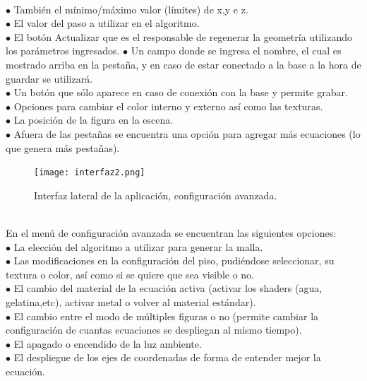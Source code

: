 \documentclass[12pt]{article}
\begin{document}
\\$\bullet$ También el mínimo/máximo valor (límites) de x,y e z.
\\$\bullet$ El valor del paso a utilizar en el algoritmo.
\\$\bullet$ El botón Actualizar que es el responsable de regenerar la geometría utilizando los parámetros ingresados.
\clearpage
$\bullet$ Un campo donde se ingresa el nombre, el cual es mostrado arriba en la pestaña, y en caso de estar conectado a la base a la hora de guardar se utilizará.
\\$\bullet$ Un botón que sólo aparece en caso de conexión con la base y permite grabar.
\\$\bullet$ Opciones para cambiar el color interno y externo así como las texturas.
\\$\bullet$ La posición de la figura en la escena.
\\$\bullet$ Afuera de las pestañas se encuentra una opción para agregar más ecuaciones (lo que genera más pestañas). \\
\begin{figure}
\texttt{[image: interfaz2.png]} 
\caption{Interfaz lateral de la aplicación, configuración avanzada.}
\label{fig:subim1}
\end{figure}
\\En el menú de configuración avanzada se encuentran las siguientes opciones:
\\$\bullet$ La elección del algoritmo a utilizar para generar la malla.
\\$\bullet$ Las modificaciones en la configuración del piso, pudiéndose seleccionar, su textura o color, así como si se quiere que sea visible o no.
\\$\bullet$ El cambio del material de la ecuación activa (activar los shaders (agua, gelatina,etc), activar metal o volver al material estándar).
\\$\bullet$ El cambio entre el modo de múltiples figuras o no (permite cambiar la configuración de cuantas ecuaciones se despliegan al mismo tiempo).
\\$\bullet$ El apagado o encendido de la luz ambiente.
\\$\bullet$ El despliegue de los ejes de coordenadas de forma de entender mejor la ecuación.
\\\\\\\\\\\\\\\\\\\\\\
\end{document}
